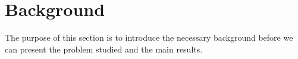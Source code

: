 \documentclass[twocolumn]{IEEEtran}
\begin{document}
\begin{comment}
Our motivation stems from the fact that ALP with tractable number of constraints will result in a full dimensionality free ADP method. However, constraint reduction in ALP is an extra source of error (in addition to the error due to LFA), which has not been theoretically well understood.  The focus of this paper is to fill this gap in theory by deriving performance bounds for constraint reduction in ALP formulation.
The salient aspects of our contribution are listed below:
\begin{enumerate}
\item We define a generalized reduced linear programming (GRLP) which has a tractable number of constraints that are obtained as positive linear combinations of the original constraints. The GRLP amounts to linear function approximation of the dual variables, and RLP is a special case of GRLP.
\item We develop a novel analytical machinery to bound the prediction error $\norm{J^*-\hj}$ where $hj$ is the solution to GRLP.
\item We also bound the performance loss due to using the policy $\hu$ that is one-step greedy with respect to $\hj$ (Theorem~\ref{polthe}).
\item Our analysis is based on two novel $\max$-norm contraction operators and our results hold \emph{deterministically}, as opposed to the results on RLP \cite{SALP,CS}, where the guarantees have a probabilistic nature.
\item Our results on GRLP are the first to theoretically analyze the use of linear function approximation of Lagrangian (dual) variables underlying the constraints.
\item A numerical example in controlled queues is provided to illustrate the theory.
\end{enumerate}
A short and preliminary version of this paper without the theoretical analysis is available in \cite{aaaipaper}. The rest of the paper is organized as follows:
\end{comment}
\fi
\section{Background} %
The purpose of this section is to introduce the necessary background before we can present the problem studied and the main results.
\end{document}
